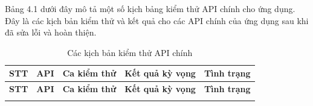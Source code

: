 Bảng 4.1 dưới đây mô tả một số kịch bảng kiểm thử API chính cho ứng dụng. Đây là các kịch bản kiểm thử và kết quả cho các API chính của ứng dụng sau khi đã sửa lỗi và hoàn thiện. 

\small
\begin{xltabular}{\textwidth}{|c|p{2cm}|X|X|c|}
    \caption{Các kịch bản kiểm thử API chính} \label{tab:api-test-cases} \\
    \hline
    \textbf{STT} & \textbf{API} & \textbf{Ca kiểm thử} & \textbf{Kết quả kỳ vọng} & \textbf{Tình trạng} \\
    \hline
    \endfirsthead
    
    \hline
    \textbf{STT} & \textbf{API} & \textbf{Ca kiểm thử} & \textbf{Kết quả kỳ vọng} & \textbf{Tình trạng} \\
    \hline
    \endhead
    
    \hline 
    \endfoot
    
    \hline
    \endlastfoot
    

\end{xltabular}
